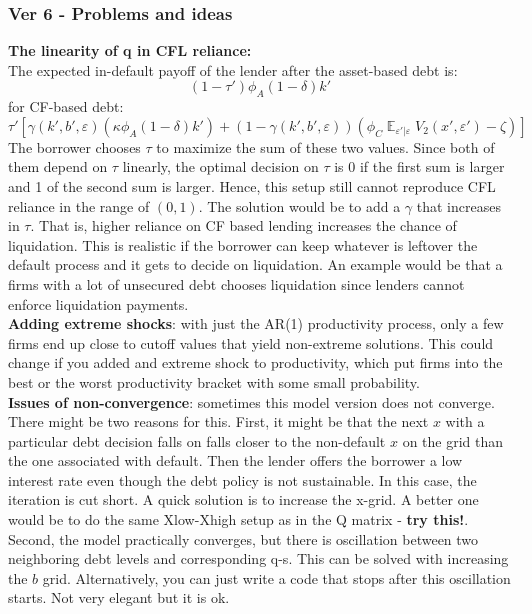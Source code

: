 \documentclass[12pt]{article}
\DeclareMathOperator{\E}{\mathbb{E}}
\begin{document}
\subsubsection*{Ver 6 - Problems and ideas}
\textbf{The linearity of q in CFL reliance:} \\
The expected in-default payoff of the lender after the asset-based debt is: 
$$  (1-\tau') \phi_A (1-\delta) k'  $$
for CF-based debt: 
$$    \tau'\left[\gamma(k',b',\varepsilon)(\kappa \phi_A  (1-\delta) k') +  (1-\gamma(k',b',\varepsilon))\left( \phi_C \E_{\varepsilon'|\varepsilon}V_2 (x', \varepsilon') - \zeta \right) \right] $$
The borrower chooses $\tau$ to maximize the sum of these two values. Since both of them depend on $\tau$ linearly, the optimal decision on $\tau$ is 0 if the first sum is larger and 1 of the second sum is larger. Hence, this setup still cannot reproduce CFL reliance in the range of $(0,1)$. The solution would be to add a $\gamma$ that increases in $\tau$. That is, higher reliance on CF based lending increases the chance of liquidation. This is realistic if the borrower can keep whatever is leftover the default process and it gets to decide on liquidation. An example would be that a firms with a lot of unsecured debt chooses liquidation since lenders cannot enforce liquidation payments. \vspace{3mm} \\
\textbf{Adding extreme shocks}: with just the AR(1) productivity process, only a few firms end up close to cutoff values that yield non-extreme solutions. This could change if you added and extreme shock to productivity, which put firms into the best or the worst productivity bracket with some small probability.  \vspace{3mm} \\ 
\textbf{Issues of non-convergence}: sometimes this model version does not converge. There might be two reasons for this. First, it might be that the next $x$ with a particular debt decision falls on falls closer to the non-default $x$ on the grid than the one associated with default. Then the lender offers the borrower a low interest rate even though the debt policy is not sustainable. In this case, the iteration is cut short. A quick solution is to increase the x-grid. A better one would be to do the same Xlow-Xhigh setup as in the Q matrix - \textbf{try this!}. Second, the model practically converges, but there is oscillation between two neighboring debt levels and corresponding q-s. This can be solved with increasing the $b$ grid. Alternatively, you can just write a code that stops after this oscillation starts. Not very elegant but it is ok.
\end{document}
